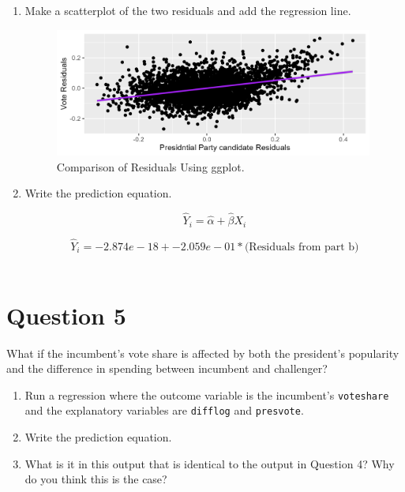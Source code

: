 \documentclass[12pt,letterpaper]{article}
\begin{document}
\begin{enumerate}
		\item Make a scatterplot of the two residuals and add the regression line.
		
	  
			
	\begin{figure}[h!]
	\centering
	\caption{\footnotesize Comparison of Residuals Using ggplot.}
	\includegraphics[width=0.99\textwidth]{residuals_scatter.png}
	
\end{figure} 
		 
		\item Write the prediction equation.
		
		{\large 			$$\hat{Y}_i = \hat{\alpha} +  \hat{\beta}X_i $$}
		
		
		{ 			$$\hat{Y}_i =  -2.874e-18 +  -2.059e-01 * \text{(Residuals from part b)} $$} \\
		
	\end{enumerate}
	
	\newpage	

\section*{Question 5}
\noindent What if the incumbent's vote share is affected by both the president's popularity and the difference in spending between incumbent and challenger? 
	\begin{enumerate}
		\item Run a regression where the outcome variable is the incumbent's \texttt{voteshare} and the explanatory variables are \texttt{difflog} and \texttt{presvote}.	\vspace{5cm}
		\item Write the prediction equation.	\vspace{5cm}
		\item What is it in this output that is identical to the output in Question 4? Why do you think this is the case?
	\end{enumerate}
\end{document}
